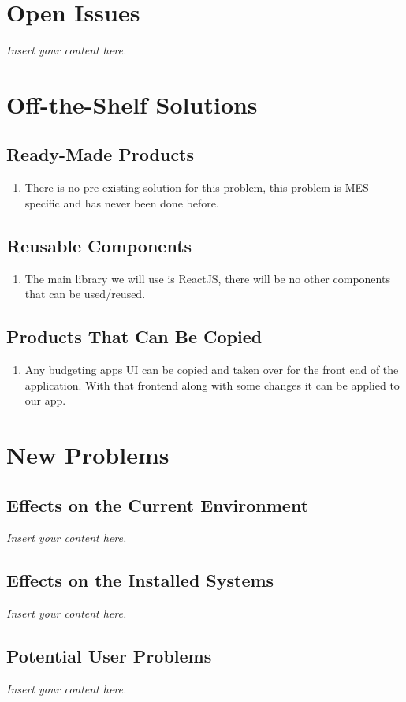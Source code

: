 \documentclass[12pt]{article}
\newcommand{\lips}{\textit{Insert your content here.}}
\begin{document}
\section{Open Issues}
\lips

\section{Off-the-Shelf Solutions}
\subsection{Ready-Made Products}
\begin{enumerate}
  \item There is no pre-existing solution for this problem, this problem is MES specific and has never been done before.
\end{enumerate}
\subsection{Reusable Components}
\begin{enumerate}
  \item The main library we will use is ReactJS, there will be no other components that can be used/reused. 
\end{enumerate}
\subsection{Products That Can Be Copied}
\begin{enumerate}
  \item Any budgeting apps UI can be copied and taken over for the front end of the application. With that frontend along with some changes it can be applied to our app. 
\end{enumerate}

\section{New Problems}
\subsection{Effects on the Current Environment}
\lips
\subsection{Effects on the Installed Systems}
\lips
\subsection{Potential User Problems}
\lips
\end{document}
